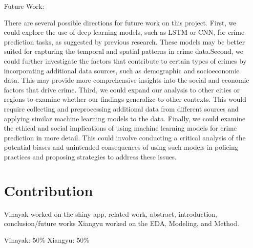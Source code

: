 \documentclass[
  article]{jss}
\begin{document}
Future Work:

There are several possible directions for future work on this project.
First, we could explore the use of deep learning models, such as LSTM or
CNN, for crime prediction tasks, as suggested by previous research.
These models may be better suited for capturing the temporal and spatial
patterns in crime data.Second, we could further investigate the factors
that contribute to certain types of crimes by incorporating additional
data sources, such as demographic and socioeconomic data. This may
provide more comprehensive insights into the social and economic factors
that drive crime. Third, we could expand our analysis to other cities or
regions to examine whether our findings generalize to other contexts.
This would require collecting and preprocessing additional data from
different sources and applying similar machine learning models to the
data. Finally, we could examine the ethical and social implications of
using machine learning models for crime prediction in more detail. This
could involve conducting a critical analysis of the potential biases and
unintended consequences of using such models in policing practices and
proposing strategies to address these issues.

\hypertarget{contribution}{%
\section{Contribution}\label{contribution}}

Vinayak worked on the shiny app, related work, abstract, introduction,
conclusion/future works Xiangyu worked on the EDA, Modeling, and Method.

Vinayak: 50\% Xiangyu: 50\%


  
\end{document}
